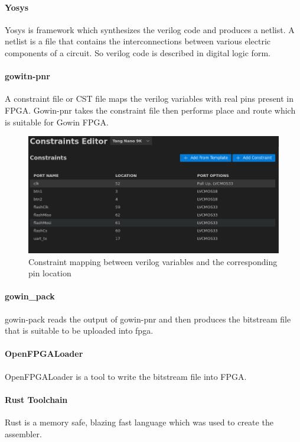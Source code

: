 \documentclass[a4paper,12pt]{article}
\begin{document}
    \paragraph{Yosys}
    Yosys is framework which synthesizes the verilog code and produces a netlist. A netlist is a file that contains the interconnections between various electric components of a circuit. So verilog code is described in digital logic form.
    \paragraph{gowitn-pnr}
    A constraint file or CST file maps the verilog variables with real pins present in FPGA. Gowin-pnr takes the constraint file then performs place and route which is suitable for Gowin FPGA.    
     \begin{figure}[H]
        \centering
        \includegraphics[width=1\textwidth ]{./images/constraint.png}
        \caption{Constraint mapping between verilog variables and the corresponding pin location}
    \end{figure}

    \paragraph{gowin\_pack}
    gowin-pack reads the output of gowin-pnr and then produces the bitstream file that is suitable to be uploaded into fpga.

    \paragraph{OpenFPGALoader}
    OpenFPGALoader is a tool to write the bitstream file into FPGA.

    \paragraph{Rust Toolchain}
    Rust is a memory safe, blazing fast language which was used to create the assembler.
\end{document}
